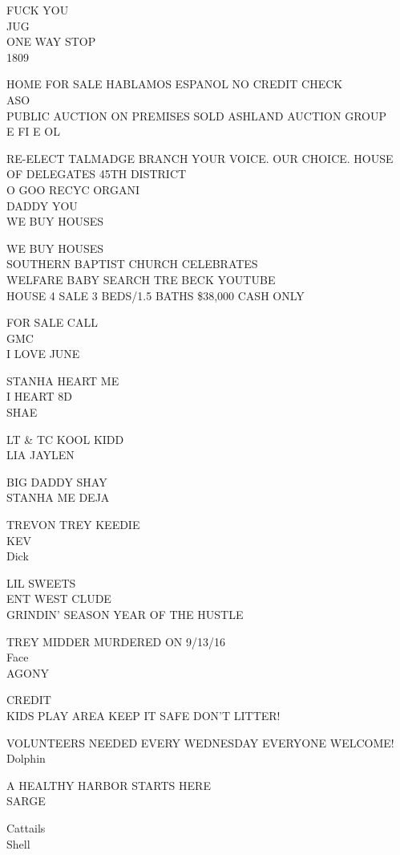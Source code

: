 \documentclass[10pt,letterpaper]{article}
\begin{document}
FUCK YOU\\
JUG\\
ONE WAY STOP\\
1809

HOME FOR SALE HABLAMOS ESPANOL NO CREDIT CHECK\\
ASO\\
PUBLIC AUCTION ON PREMISES SOLD ASHLAND AUCTION GROUP\\
E FI E OL

RE{-}ELECT TALMADGE BRANCH YOUR VOICE.  OUR CHOICE.  HOUSE OF DELEGATES 45TH DISTRICT\\
O GOO RECYC ORGANI\\
DADDY YOU\\
WE BUY HOUSES

WE BUY HOUSES\\
SOUTHERN BAPTIST CHURCH CELEBRATES\\
WELFARE BABY SEARCH TRE BECK YOUTUBE\\
HOUSE 4 SALE 3 BEDS/1.5 BATHS \$38,000 CASH ONLY

FOR SALE CALL\\
GMC\\
I LOVE JUNE

STANHA HEART ME\\
I HEART 8D\\
SHAE

LT \& TC KOOL KIDD\\
LIA JAYLEN

BIG DADDY SHAY\\
STANHA ME DEJA

TREVON TREY KEEDIE\\
KEV\\
Dick

LIL SWEETS\\
ENT WEST CLUDE\\
GRINDIN' SEASON YEAR OF THE HUSTLE

TREY MIDDER MURDERED ON 9/13/16\\
Face\\
AGONY

CREDIT\\
KIDS PLAY AREA KEEP IT SAFE DON'T LITTER!

VOLUNTEERS NEEDED EVERY WEDNESDAY EVERYONE WELCOME!\\
Dolphin

A HEALTHY HARBOR STARTS HERE\\
SARGE

Cattails\\
Shell
\end{document}
